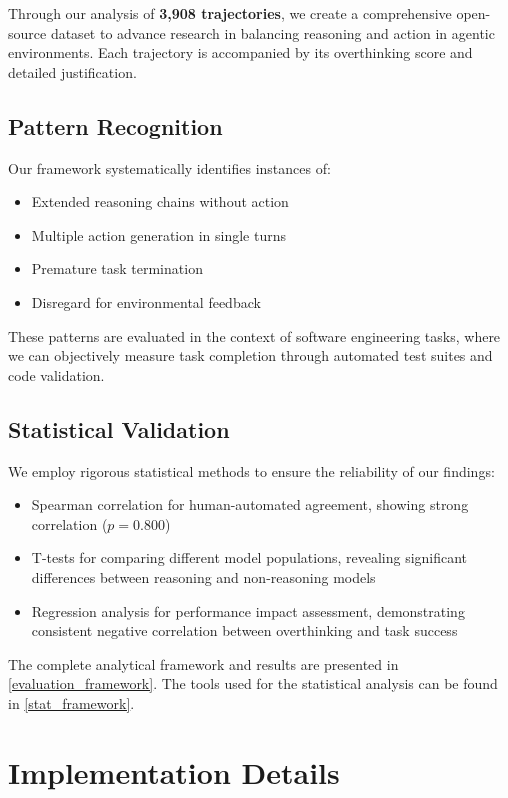Through our analysis of \textbf{3,908 trajectories}, we create a comprehensive open-source dataset to advance research in balancing reasoning and action in agentic environments. Each trajectory is accompanied by its overthinking score and detailed justification.

\subsection{Pattern Recognition}
Our framework systematically identifies instances of:
\begin{itemize}
    \item Extended reasoning chains without action
    \item Multiple action generation in single turns
    \item Premature task termination
    \item Disregard for environmental feedback
\end{itemize}

These patterns are evaluated in the context of software engineering tasks, where we can objectively measure task completion through automated test suites and code validation.

\subsection{Statistical Validation}
We employ rigorous statistical methods to ensure the reliability of our findings:
\begin{itemize}
    \item Spearman correlation for human-automated agreement, showing strong correlation ($p = 0.800$)
    \item T-tests for comparing different model populations, revealing significant differences between reasoning and non-reasoning models
    \item Regression analysis for performance impact assessment, demonstrating consistent negative correlation between overthinking and task success
\end{itemize}

The complete analytical framework and results are presented in \cref{evaluation_framework}. The tools used for the statistical analysis can be found in \cref{stat_framework}.

\section{Implementation Details}
\label{sec:implementation}

